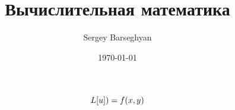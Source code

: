 \documentclass[a4paper,12pt]{article}
\title{Вычислительная математика}
\author{Sergey Barseghyan}
\affiliation{Moscow Institute of Physics and Technology}
\date{\today}
\theoremstyle{definition} %
\theoremstyle{plain} %
\theoremstyle{remark} %
\theoremstyle{underline}
\begin{document}
	
\maketitle
\[
\L{u}=f(x,y)

\]

	
\end{document}
